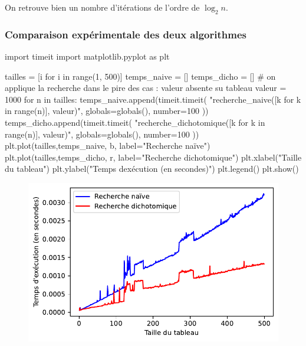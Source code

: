 \documentclass[
  a4paper,
  DIV=11,
  numbers=noendperiod]{scrartcl}
\newenvironment{Shaded}{\begin{snugshade}}{\end{snugshade}}
\newcommand{\BuiltInTok}[1]{\textcolor[rgb]{0.00,0.23,0.31}{#1}}
\newcommand{\CommentTok}[1]{\textcolor[rgb]{0.37,0.37,0.37}{#1}}
\newcommand{\ControlFlowTok}[1]{\textcolor[rgb]{0.00,0.23,0.31}{#1}}
\newcommand{\DecValTok}[1]{\textcolor[rgb]{0.68,0.00,0.00}{#1}}
\newcommand{\ImportTok}[1]{\textcolor[rgb]{0.00,0.46,0.62}{#1}}
\newcommand{\KeywordTok}[1]{\textcolor[rgb]{0.00,0.23,0.31}{#1}}
\newcommand{\NormalTok}[1]{\textcolor[rgb]{0.00,0.23,0.31}{#1}}
\newcommand{\OperatorTok}[1]{\textcolor[rgb]{0.37,0.37,0.37}{#1}}
\newcommand{\StringTok}[1]{\textcolor[rgb]{0.13,0.47,0.30}{#1}}
\begin{document}
On retrouve bien un nombre d'itérations de l'ordre de \(\log_2 n\).

\hypertarget{comparaison-expuxe9rimentale-des-deux-algorithmes}{%
\subsubsection{Comparaison expérimentale des deux
algorithmes}\label{comparaison-expuxe9rimentale-des-deux-algorithmes}}

\begin{Shaded}
\begin{Highlighting}[]
\ImportTok{import}\NormalTok{ timeit}
\ImportTok{import}\NormalTok{ matplotlib.pyplot }\ImportTok{as}\NormalTok{ plt}

\NormalTok{tailles }\OperatorTok{=}\NormalTok{ [i }\ControlFlowTok{for}\NormalTok{ i }\KeywordTok{in} \BuiltInTok{range}\NormalTok{(}\DecValTok{1}\NormalTok{, }\DecValTok{500}\NormalTok{)]}
\NormalTok{temps\_naive }\OperatorTok{=}\NormalTok{ []}
\NormalTok{temps\_dicho }\OperatorTok{=}\NormalTok{ []}
\CommentTok{\# on applique la recherche dans le pire des cas : valeur absente su tableau}
\NormalTok{valeur }\OperatorTok{=} \DecValTok{1000}
\ControlFlowTok{for}\NormalTok{ n }\KeywordTok{in}\NormalTok{ tailles:}
\NormalTok{    temps\_naive.append(timeit.timeit(}
        \StringTok{"recherche\_naive([k for k in range(n)], valeur)"}\NormalTok{,}
        \BuiltInTok{globals}\OperatorTok{=}\BuiltInTok{globals}\NormalTok{(),}
\NormalTok{        number}\OperatorTok{=}\DecValTok{100}
\NormalTok{    ))}
\NormalTok{    temps\_dicho.append(timeit.timeit(}
        \StringTok{"recherche\_dichotomique([k for k in range(n)], valeur)"}\NormalTok{,}
        \BuiltInTok{globals}\OperatorTok{=}\BuiltInTok{globals}\NormalTok{(),}
\NormalTok{        number}\OperatorTok{=}\DecValTok{100}
\NormalTok{    ))}
\NormalTok{plt.plot(tailles,temps\_naive, }\StringTok{\textquotesingle{}b\textquotesingle{}}\NormalTok{, label}\OperatorTok{=}\StringTok{"Recherche naïve"}\NormalTok{)}
\NormalTok{plt.plot(tailles,temps\_dicho, }\StringTok{\textquotesingle{}r\textquotesingle{}}\NormalTok{, label}\OperatorTok{=}\StringTok{"Recherche dichotomique"}\NormalTok{)}
\NormalTok{plt.xlabel(}\StringTok{"Taille du tableau"}\NormalTok{)}
\NormalTok{plt.ylabel(}\StringTok{"Temps d\textquotesingle{}exécution (en secondes)"}\NormalTok{)}
\NormalTok{plt.legend()}
\NormalTok{plt.show()}
\end{Highlighting}
\end{Shaded}

\begin{figure}[H]

{\centering \includegraphics{recherche_files/figure-pdf/cell-8-output-1.pdf}

}

\end{figure}
\end{document}
